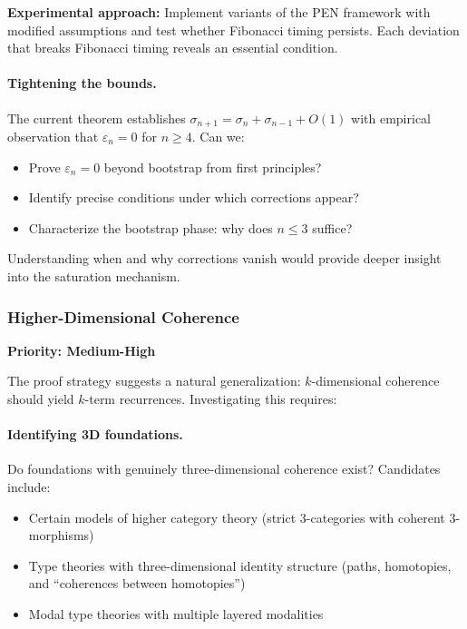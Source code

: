 \documentclass[11pt]{article}
\theoremstyle{definition}
\theoremstyle{remark}
\begin{document}
\textbf{Experimental approach:} Implement variants of the PEN framework with modified assumptions
and test whether Fibonacci timing persists. Each deviation that breaks Fibonacci timing reveals an
essential condition.

\paragraph{Tightening the bounds.}
The current theorem establishes $\sigma_{n+1} = \sigma_n + \sigma_{n-1} + O(1)$ with empirical observation
that $\varepsilon_n = 0$ for $n \geq 4$. Can we:

\begin{itemize}
\item Prove $\varepsilon_n = 0$ beyond bootstrap from first principles?
\item Identify precise conditions under which corrections appear?
\item Characterize the bootstrap phase: why does $n \leq 3$ suffice?
\end{itemize}

Understanding when and why corrections vanish would provide deeper insight into the saturation
mechanism.

\subsubsection{Higher-Dimensional Coherence}

\textbf{Priority: Medium-High}

The proof strategy suggests a natural generalization: $k$-dimensional coherence should yield $k$-term
recurrences. Investigating this requires:

\paragraph{Identifying 3D foundations.}
Do foundations with genuinely three-dimensional coherence exist? Candidates include:
\begin{itemize}
\item Certain models of higher category theory (strict 3-categories with coherent 3-morphisms)
\item Type theories with three-dimensional identity structure (paths, homotopies, and ``coherences
between homotopies'')
\item Modal type theories with multiple layered modalities
\end{itemize}
\end{document}
